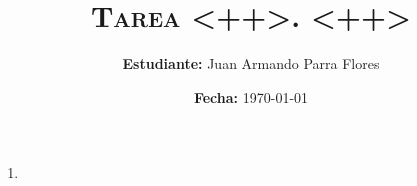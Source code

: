 \documentclass[11pt]{article}
\title{
    \textsc{
        \textbf{Tarea <++>.} <++>
    }
}
\author{
    \textbf{Estudiante:} Juan Armando Parra Flores
}
\date{
    \textbf{Fecha:} \today
}
\begin{document}
    \maketitle

    \begin{enumerate}
        \item
            
            
    \end{enumerate}

\end{document}
